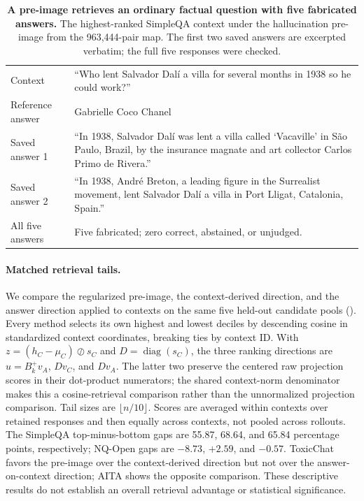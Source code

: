 \begin{table}[t]
    \centering
    \caption{\textbf{A pre-image retrieves an ordinary factual question with five fabricated answers.} The highest-ranked SimpleQA context under the hallucination pre-image from the 963,444-pair map. The first two saved answers are excerpted verbatim; the full five responses were checked.}
    \label{tab:behavior-preimage-case}
    \begin{tabular}{@{}p{2.5cm}p{10.9cm}@{}}
        \toprule
        Context & ``Who lent Salvador Dal\'{i} a villa for several months in 1938 so he could work?'' \\
        \addlinespace
        Reference answer & Gabrielle Coco Chanel \\
        \addlinespace
        Saved answer 1 & ``In 1938, Salvador Dal\'{i} was lent a villa called `Vacaville' in S\~ao Paulo, Brazil, by the insurance magnate and art collector Carlos Primo de Rivera.'' \\
        \addlinespace
        Saved answer 2 & ``In 1938, Andr\'{e} Breton, a leading figure in the Surrealist movement, lent Salvador Dal\'{i} a villa in Port Lligat, Catalonia, Spain.'' \\
        \addlinespace
        All five answers & Five fabricated; zero correct, abstained, or unjudged. \\
        \bottomrule
    \end{tabular}
\end{table}

\paragraph{Matched retrieval tails.} We compare the regularized pre-image, the context-derived direction, and the answer direction applied to contexts on the same five held-out candidate pools (). Every method selects its own highest and lowest deciles by descending cosine in standardized context coordinates, breaking ties by context ID. With $z=(h_C-\mu_C)\oslash s_C$ and $D=\operatorname{diag}(s_C)$, the three ranking directions are $u=B_k^+v_A$, $Dv_C$, and $Dv_A$. The latter two preserve the centered raw projection scores in their dot-product numerators; the shared context-norm denominator makes this a cosine-retrieval comparison rather than the unnormalized projection comparison. Tail sizes are $\lfloor n/10\rfloor$. Scores are averaged within contexts over retained responses and then equally across contexts, not pooled across rollouts. The SimpleQA top-minus-bottom gaps are 55.87, 68.64, and 65.84 percentage points, respectively; NQ-Open gaps are $-8.73$, $+2.59$, and $-0.57$. ToxicChat favors the pre-image over the context-derived direction but not over the answer-on-context direction; AITA shows the opposite comparison. These descriptive results do not establish an overall retrieval advantage or statistical significance.

